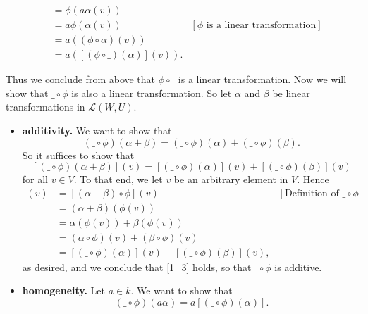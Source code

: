 \documentclass[9pt]{article}
\begin{document}
\begin{enumerate}
\begin{itemize}
\begin{align*}
                     &= \phi(a\alpha(v)) \\
                     &= a\phi(\alpha(v)) 
                        &[\phi\text{ is a linear transformation}] \\
                     &= a((\phi\circ\alpha)(v)) \\
                     &= a([(\phi\circ\_)(\alpha)](v)).
               \end{align*}
      \end{itemize}
      Thus we conclude from above that $\phi\circ\_$ is a linear transformation.
      Now we will show that $\_\circ\phi$ is also a linear transformation. So
      let $\alpha$ and $\beta$ be linear transformations in $\mathcal{L}(W, U)$.
      
      \begin{itemize}
         \item \textbf{additivity.} We want to show that
               \begin{equation} \label{1_3}
                  (\_\circ\phi)(\alpha+\beta) = (\_\circ\phi)(\alpha) +
                  (\_\circ\phi)(\beta).
               \end{equation}
               So it suffices to show that
               $$[(\_\circ\phi)(\alpha+\beta)](v) = [(\_\circ\phi)(\alpha)](v) +
                 [(\_\circ\phi)(\beta)](v)$$
               for all $v \in V$. To that end, we let $v$ be an arbitrary
               element in $V$. Hence
               \begin{align*}
                  [(\_\circ\phi)(\alpha+\beta)](v) &=
                     [(\alpha+\beta)\circ\phi](v)
                        &[\text{Definition of }\_\circ\phi ] \\
                     &= (\alpha + \beta)(\phi(v)) \\
                     &= \alpha(\phi(v)) + \beta(\phi(v)) \\
                     &= (\alpha\circ\phi)(v) + (\beta\circ\phi)(v) \\
                     &= [(\_\circ\phi)(\alpha)](v) + [(\_\circ\phi)(\beta)](v),
               \end{align*}
               as desired, and we conclude that \eqref{1_3} holds, so that
               $\_\circ\phi$ is additive.
         \item \textbf{homogeneity.} Let $a \in k$. We want to show that
               \begin{equation} \label{1_4}
                  (\_\circ\phi)(a\alpha) = a[(\_\circ\phi)(\alpha)].

\end{equation}
\end{itemize}
\end{enumerate}
\end{document}
